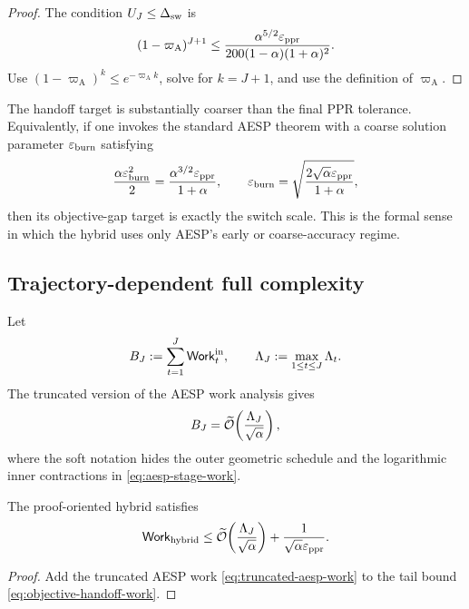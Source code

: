 \begin{proof}
The condition \(U_J\leq\Delta_{\rm sw}\) is
\[
    (1-\varpi_{\mathrm A})^{J+1}
    \leq
    \frac{\alpha^{5/2}\varepsilon_{\mathrm{ppr}}}
         {200(1-\alpha)(1+\alpha)^2}.
\]
Use \((1-\varpi_{\mathrm A})^k\leq e^{-\varpi_{\mathrm A} k}\), solve for \(k=J+1\),
and use the definition of \(\varpi_{\mathrm A}\).
\end{proof}

The handoff target is substantially coarser than the final PPR tolerance.
Equivalently, if one invokes the standard AESP theorem with a coarse solution
parameter \(\varepsilon_{\mathrm{burn}}\) satisfying
\begin{equation}
    \frac{\alpha\varepsilon_{\mathrm{burn}}^2}{2}
    =\frac{\alpha^{3/2}\varepsilon_{\mathrm{ppr}}}{1+\alpha},
    \qquad
    \varepsilon_{\mathrm{burn}}
    =\sqrt{\frac{2\sqrt\alpha\varepsilon_{\mathrm{ppr}}}{1+\alpha}},
    \label{eq:coarse-aesp-tolerance}
\end{equation}
then its objective-gap target is exactly the switch scale.  This is the formal
sense in which the hybrid uses only AESP's early or coarse-accuracy regime.

\subsection{Trajectory-dependent full complexity}

Let
\begin{equation}
    B_J:=\sum_{t=1}^{J}\mathsf{Work}_t^{\rm in},
    \qquad
    \Lambda_J:=\max_{1\leq t\leq J}\Lambda_t.
    \label{eq:burn-work-and-locality}
\end{equation}
The truncated version of the AESP work analysis gives
\begin{equation}
    B_J
    =\widetilde{\mathcal O}\!\left(\frac{\Lambda_J}{\sqrt\alpha}\right),
    \label{eq:truncated-aesp-work}
\end{equation}
where the soft notation hides the outer geometric schedule and the logarithmic
inner contractions in \cref{eq:aesp-stage-work}.

\begin{theorem}
\label{thm:trajectory-total}
The proof-oriented hybrid satisfies
\begin{equation}
    \mathsf{Work}_{\rm hybrid}
    \leq
    \widetilde{\mathcal O}\!\left(\frac{\Lambda_J}{\sqrt\alpha}\right)
    +\frac{1}{\sqrt\alpha\varepsilon_{\mathrm{ppr}}}.
    \label{eq:trajectory-total-work}
\end{equation}
\end{theorem}

\begin{proof}
Add the truncated AESP work \cref{eq:truncated-aesp-work} to the tail bound
\cref{eq:objective-handoff-work}.
\end{proof}

